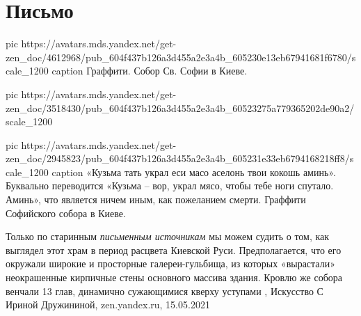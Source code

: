  
 
 
 
 
\chapter{Письмо}

\ifcmt
  pic https://avatars.mds.yandex.net/get-zen_doc/4612968/pub_604f437b126a3d455a2e3a4b_605230e13eb67941681f6780/scale_1200
	caption Граффити. Собор Св. Софии в Киеве.

	pic https://avatars.mds.yandex.net/get-zen_doc/3518430/pub_604f437b126a3d455a2e3a4b_60523275a779365202de90a2/scale_1200

	pic https://avatars.mds.yandex.net/get-zen_doc/2945823/pub_604f437b126a3d455a2e3a4b_605231e33eb6794168218ff8/scale_1200
	caption «Кузьма тать украл еси масо аселонь твои кокошь аминь». Буквально переводится «Кузьма – вор, украл мясо, чтобы тебе ноги спутало. Аминь», что является ничем иным, как пожеланием смерти. Граффити Софийского собора в Киеве.

\fi
Только по старинным \emph{письменным источникам} мы можем судить о том, как выглядел
этот храм в период расцвета Киевской Руси. Предполагается, что его окружали
широкие и просторные галереи-гульбища, из которых «вырастали» неокрашенные
кирпичные стены основного массива здания. Кровлю же собора венчали 13 глав,
динамично сужающимися кверху уступами
, 
Искусство С Ириной Дружининой, zen.yandex.ru, 15.05.2021
